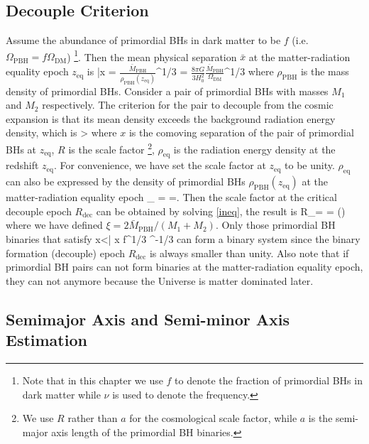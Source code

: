 \subsection{Decouple Criterion}
Assume the abundance of primordial \acp{BH} in dark matter to be $f$ (i.e. $\Omega_{\textrm{PBH}} = f \Omega_\textrm{DM}$) \footnote{Note that in this chapter we use $f$ to denote the fraction of primordial \acp{BH} in dark matter while $\nu$ is used to denote the frequency.}. 
Then the mean physical separation $\bar{x}$ at the matter-radiation equality epoch $z_\text{eq}$ is
\be
\bar{x} = \(\frac{\bar{M}_\text{PBH}}{\rho _\text{PBH}(z_\text{eq})}\)^{1/3} = \(\frac{8\pi G}{3H_0^2}\frac{\bar{M}_\text{PBH}}{\Omega_\text{DM}}\)^{1/3}
\ee
where $\rho_\text{PBH}$ is the mass density of primordial \acp{BH}.
Consider a pair of primordial \acp{BH} with masses $M_1$ and $M_2$ respectively. 
The criterion for the pair to decouple from the cosmic expansion is that its mean density exceeds the background radiation energy density, which is
\be
{}>
\label{ineq}
\ee
where $x$ is the comoving separation of the pair of primordial \acp{BH} at $z_\text{eq}$, $R$ is the scale factor \footnote{We use $R$ rather than $a$ for the cosmological scale factor, while $a$ is the semi-major axis length of the primordial \ac{BH} binaries.}, $\rho_\text{eq}$ is the radiation energy density at the redshift $z_\text{eq}$. 
For convenience, we have set the scale factor at $z_\text{eq}$ to be unity. 
$\rho_\text{eq}$ can also be expressed by the density of primordial \acp{BH} $\rho_\text{PBH}(z_\text{eq})$ at the matter-radiation equality epoch
\be\label{rhoeq}
\rho_ =  =. 
\ee
Then the scale factor at the critical decouple epoch $R_\text{dec}$ can be obtained by solving \cref{ineq}, the result is
\be
R_= =  ()
\ee
where we have defined $\xi = 2\bar{ M}_\text{PBH}/(M_1+M_2)$. 
Only those primordial \ac{BH} binaries that satisfy
\be\label{constraint}
x<\bar{ x} f^{1/3} \xi ^{-1/3}
\ee
can form a binary system since the binary formation (decouple) epoch $R_\text{dec}$ is always smaller than unity. 
Also note that if primordial \ac{BH} pairs can not form binaries at the matter-radiation equality epoch, they can not anymore because the Universe is matter dominated later.

\subsection{Semimajor Axis and Semi-minor Axis Estimation}

